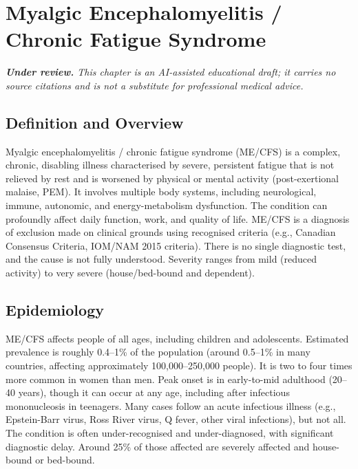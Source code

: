 \chapter{Myalgic Encephalomyelitis / Chronic Fatigue Syndrome}

\medskip
\noindent\textit{\textbf{Under review.} This chapter is an AI-assisted educational draft; it carries no source citations and is not a substitute for professional medical advice.}

\section*{Definition and Overview}
Myalgic encephalomyelitis / chronic fatigue syndrome (ME/CFS) is a complex, chronic, disabling illness characterised by severe, persistent fatigue that is not relieved by rest and is worsened by physical or mental activity (post-exertional malaise, PEM). It involves multiple body systems, including neurological, immune, autonomic, and energy-metabolism dysfunction. The condition can profoundly affect daily function, work, and quality of life. ME/CFS is a diagnosis of exclusion made on clinical grounds using recognised criteria (e.g., Canadian Consensus Criteria, IOM/NAM 2015 criteria). There is no single diagnostic test, and the cause is not fully understood. Severity ranges from mild (reduced activity) to very severe (house/bed-bound and dependent).

\section*{Epidemiology}
ME/CFS affects people of all ages, including children and adolescents. Estimated prevalence is roughly 0.4--1\% of the population (around 0.5--1\% in many countries, affecting approximately 100,000--250,000 people). It is two to four times more common in women than men. Peak onset is in early-to-mid adulthood (20--40 years), though it can occur at any age, including after infectious mononucleosis in teenagers. Many cases follow an acute infectious illness (e.g., Epstein-Barr virus, Ross River virus, Q fever, other viral infections), but not all. The condition is often under-recognised and under-diagnosed, with significant diagnostic delay. Around 25\% of those affected are severely affected and house-bound or bed-bound.

